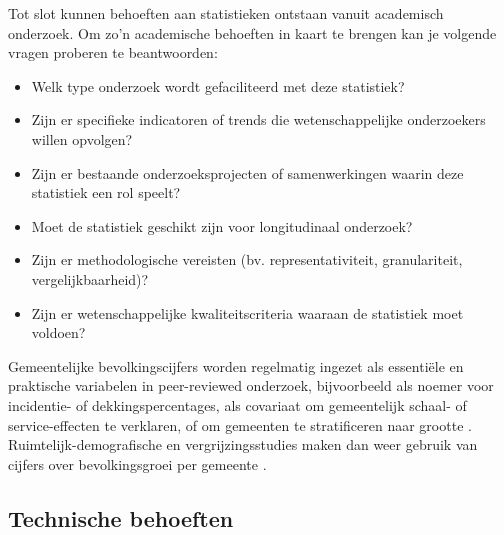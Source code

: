 \documentclass[\mainfiledir/00_handleiding_statistiekproductie.tex]{subfiles}
\begin{document}
Tot slot kunnen behoeften aan statistieken ontstaan vanuit academisch onderzoek. Om zo'n academische behoeften in kaart te brengen kan je volgende vragen proberen te beantwoorden: 
\begin{itemize}[nosep]
    \item Welk type onderzoek wordt gefaciliteerd met deze statistiek?
    \item Zijn er specifieke indicatoren of trends die wetenschappelijke onderzoekers willen opvolgen?
    \item Zijn er bestaande onderzoeksprojecten of samenwerkingen waarin deze statistiek een rol speelt?
    \item Moet de statistiek geschikt zijn voor longitudinaal onderzoek?
    \item Zijn er methodologische vereisten (bv. representativiteit, granulariteit, vergelijkbaarheid)?
    \item Zijn er wetenschappelijke kwaliteitscriteria waaraan de statistiek moet voldoen?
\end{itemize}

Gemeentelijke bevolkingscijfers worden regelmatig ingezet als essentiële en praktische variabelen in peer-reviewed onderzoek, bijvoorbeeld als noemer voor incidentie- of dekkingspercentages, als covariaat om gemeentelijk schaal- of service-effecten te verklaren, of om gemeenten te stratificeren naar grootte \parencite[zie bijvoorbeeld][]{vandevijvere2023unhealthy, dInverno2022local, mustafa2020self}. Ruimtelijk-demografische en vergrijzingsstudies maken dan weer gebruik van cijfers over bevolkingsgroei per gemeente \parencite[zie bijvoorbeeld][]{schockaert2018local}. 





\subsection{Technische behoeften}
\end{document}
